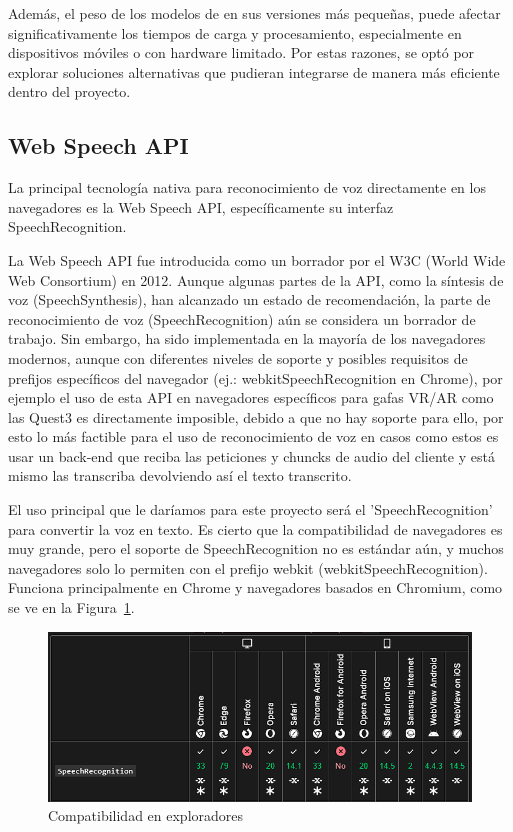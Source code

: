 \documentclass[a4paper, 12pt]{book}
\begin{document}
Además, el peso de los modelos de en sus versiones más pequeñas, puede afectar significativamente los tiempos de carga y procesamiento, especialmente en dispositivos móviles o con hardware limitado. Por estas razones, se optó por explorar soluciones alternativas que pudieran integrarse de manera más eficiente dentro del proyecto.


\subsection{Web Speech API}

La principal tecnología nativa para reconocimiento de voz directamente en los navegadores es la Web Speech API, específicamente su interfaz SpeechRecognition.

La Web Speech API fue introducida como un borrador por el W3C (World Wide Web Consortium) en 2012. Aunque algunas partes de la API, como la síntesis de voz (SpeechSynthesis), han alcanzado un estado de recomendación, la parte de reconocimiento de voz (SpeechRecognition) aún se considera un borrador de trabajo. Sin embargo, ha sido implementada en la mayoría de los navegadores modernos, aunque con diferentes niveles de soporte y posibles requisitos de prefijos específicos del navegador (ej.: webkitSpeechRecognition en Chrome), por ejemplo el uso de esta API en navegadores específicos para gafas VR/AR como las Quest3 es directamente imposible, debido a que no hay soporte para ello, por esto lo más factible para el uso de reconocimiento de voz en casos como estos es usar un back-end que reciba las peticiones y chuncks de audio del cliente y está mismo las transcriba devolviendo así el texto transcrito.

El uso principal que le daríamos para este proyecto será el 'SpeechRecognition' para convertir la voz en texto. Es cierto que la compatibilidad de navegadores es muy grande, pero el soporte de SpeechRecognition no es estándar aún, y muchos navegadores solo lo permiten con el prefijo webkit (webkitSpeechRecognition). Funciona principalmente en Chrome y navegadores basados en Chromium, como se ve en la Figura~\ref{fig:SpeechRecognitionAPI}.

\begin{figure}[H]
    \centering
    \includegraphics[width=0.8\linewidth]{img/WebSpeechAPI.png}
    \caption{Compatibilidad en exploradores}
    \label{fig:SpeechRecognitionAPI}
\end{figure}
\end{document}
